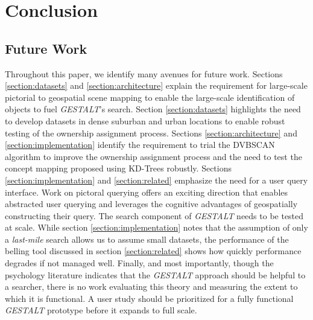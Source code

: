 \section{Conclusion}
\label{section:conclusion}

\subsection{Future Work}
Throughout this paper, we identify many avenues for future work. Sections \ref{section:datasets} and \ref{section:architecture} explain the requirement for large-scale pictorial to geospatial scene mapping to enable the large-scale identification of objects to fuel \emph{GESTALT}'s search. 
Section \ref{section:datasets} highlights the need to develop datasets in dense suburban and urban locations to enable robust testing of the ownership assignment process. 
Sections \ref{section:architecture} and \ref{section:implementation} identify the requirement to trial the DVBSCAN algorithm to improve the ownership assignment process and the need to test the concept mapping proposed using KD-Trees robustly.
Sections \ref{section:implementation} and \ref{section:related} emphasize the need for a user query interface. Work on pictoral querying offers an exciting direction that enables abstracted user querying and leverages the cognitive advantages of geospatially constructing their query. 
The search component of \textit{GESTALT} needs to be tested at scale. While section \ref{section:implementation} notes that the assumption of only a \textit{last-mile} search allows us to assume small datasets, the performance of the belling tool discussed in section \ref{section:related} shows how quickly performance degrades if not managed well.
Finally, and most importantly, though the psychology literature indicates that the \textit{GESTALT} approach should be helpful to a searcher, there is no work evaluating this theory and measuring the extent to which it is functional. A user study should be prioritized for a fully functional \textit{GESTALT} prototype before it expands to full scale.

